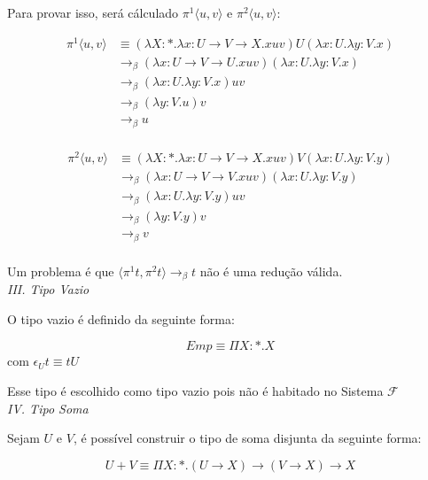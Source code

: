 \documentclass[../main.tex]{subfiles}
\begin{document}
Para provar isso, será cálculado $\pi^1 \langle u, v \rangle$ e $\pi^2 \langle u, v \rangle$:

\begin{align*}
    \pi^1 \langle u, v \rangle & \equiv (\lambda X : \ast . \lambda x : U \to V \to X . xuv)U(\lambda x : U . \lambda y : V . x) \\
                               & \to_{\beta} (\lambda x : U \to V \to U . xuv)(\lambda x : U . \lambda y : V . x) \\
                               & \to_{\beta} (\lambda x : U . \lambda y : V . x)uv \\
                               & \to_{\beta} (\lambda y : V . u)v \\
                               & \to_{\beta} u \\
\end{align*}

\begin{align*}
    \pi^2 \langle u, v \rangle & \equiv (\lambda X : \ast . \lambda x : U \to V \to X . xuv)V(\lambda x : U . \lambda y : V . y) \\
                               & \to_{\beta} (\lambda x : U \to V \to V . xuv)(\lambda x : U . \lambda y : V . y) \\
                               & \to_{\beta} (\lambda x : U . \lambda y : V . y)uv \\
                               & \to_{\beta} (\lambda y : V . y)v \\
                               & \to_{\beta} v \\
\end{align*}

Um problema é que $\langle \pi^1 t, \pi^2 t \rangle \to_{\beta} t$ não é uma redução válida.\\

\emph{III. Tipo Vazio}

O tipo vazio é definido da seguinte forma:

$$Emp \equiv \Pi X : \ast . X$$ com $\epsilon_U t \equiv tU$

Esse tipo é escolhido como tipo vazio pois não é habitado no Sistema $\mathcal{F}$\\

\emph{IV. Tipo Soma}

Sejam $U$ e $V$, é possível construir o tipo de soma disjunta da seguinte forma:

$$U + V \equiv \Pi X : \ast . (U \to X) \to (V \to X) \to X$$
\end{document}
